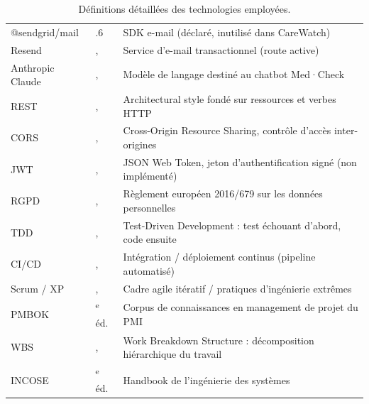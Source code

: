 \documentclass[11pt,a4paper]{article}
\begin{document}
\begin{table}[H]
\begin{tabularx}{\linewidth}{>{\raggedright\arraybackslash}p{2.7cm} >{\raggedright\arraybackslash}p{2.5cm} >{\raggedright\arraybackslash}X}
@sendgrid/mail & 8.1.6 & SDK e-mail (déclaré, inutilisé dans CareWatch) \\
Resend &, & Service d'e-mail transactionnel (route active) \\
Anthropic Claude &, & Modèle de langage destiné au chatbot Med·Check \\
REST &, & Architectural style fondé sur ressources et verbes HTTP \\
CORS &, & Cross-Origin Resource Sharing, contrôle d'accès inter-origines \\
JWT &, & JSON Web Token, jeton d'authentification signé (non implémenté) \\
RGPD &, & Règlement européen 2016/679 sur les données personnelles \\
TDD &, & Test-Driven Development : test échouant d'abord, code ensuite \\
CI/CD &, & Intégration / déploiement continus (pipeline automatisé) \\
Scrum / XP &, & Cadre agile itératif / pratiques d'ingénierie extrêmes \\
PMBOK & 7\textsuperscript{e} éd. & Corpus de connaissances en management de projet du PMI \\
WBS &, & Work Breakdown Structure : décomposition hiérarchique du travail \\
INCOSE & 5\textsuperscript{e} éd. & Handbook de l'ingénierie des systèmes \\
\bottomrule
\end{tabularx}
\caption{Définitions détaillées des technologies employées.}
\end{table}
\end{document}
